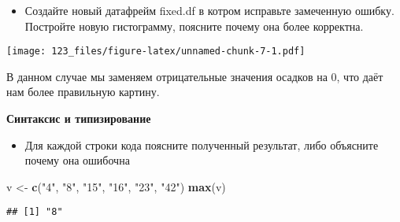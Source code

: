 \documentclass[
]{article}
\newenvironment{Shaded}{\begin{snugshade}}{\end{snugshade}}
\newcommand{\AttributeTok}[1]{\textcolor[rgb]{0.13,0.29,0.53}{#1}}
\newcommand{\DecValTok}[1]{\textcolor[rgb]{0.00,0.00,0.81}{#1}}
\newcommand{\FunctionTok}[1]{\textcolor[rgb]{0.13,0.29,0.53}{\textbf{#1}}}
\newcommand{\NormalTok}[1]{#1}
\newcommand{\OtherTok}[1]{\textcolor[rgb]{0.56,0.35,0.01}{#1}}
\newcommand{\SpecialCharTok}[1]{\textcolor[rgb]{0.81,0.36,0.00}{\textbf{#1}}}
\newcommand{\StringTok}[1]{\textcolor[rgb]{0.31,0.60,0.02}{#1}}
\providecommand{\tightlist}{%
  \setlength{\itemsep}{0pt}\setlength{\parskip}{0pt}}
\begin{document}
\begin{itemize}
\tightlist
\item
  Создайте новый датафрейм fixed.df в котром исправьте замеченную
  ошибку. Постройте новую гистограмму, поясните почему она более
  корректна.
\end{itemize}

\begin{Shaded}
\end{Shaded}

\texttt{[image: 123\_files/figure-latex/unnamed-chunk-7-1.pdf]}

В данном случае мы заменяем отрицательные значения осадков на 0, что
даёт нам более правильную картину.

\textbf{Синтаксис и типизирование}

\begin{itemize}
\tightlist
\item
  Для каждой строки кода поясните полученный результат, либо объясните
  почему она ошибочна
\end{itemize}

\begin{Shaded}
\begin{Highlighting}[]
\NormalTok{v }\OtherTok{\textless{}{-}} \FunctionTok{c}\NormalTok{(}\StringTok{"4"}\NormalTok{, }\StringTok{"8"}\NormalTok{, }\StringTok{"15"}\NormalTok{, }\StringTok{"16"}\NormalTok{, }\StringTok{"23"}\NormalTok{, }\StringTok{"42"}\NormalTok{)}
\FunctionTok{max}\NormalTok{(v)}
\end{Highlighting}
\end{Shaded}

\begin{verbatim}
## [1] "8"
\end{verbatim}
\end{document}
